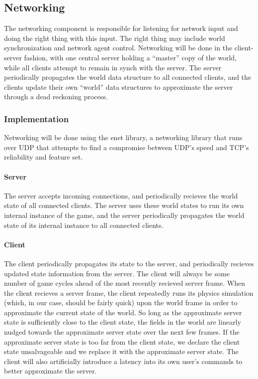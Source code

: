 \documentclass[12pt]{article}
\begin{document}
\subsection{Networking}
The networking component is responsible for listening for network input and
doing the right thing with this input. The right thing may include world
synchronization and network agent control.  Networking will be done in the client-server fashion, with one central server holding a ``master'' copy of the world, while all clients attempt to remain in synch with the server.  The server periodically propagates the world data structure to all connected clients, and the clients update their own ``world'' data structures to approximate the server through a dead reckoning process.

\subsubsection{Implementation}

Networking will be done using the enet library, a networking library that runs over UDP that attempts to find a compromise between UDP's speed and TCP's reliability and feature set.

\paragraph{Server}
The server accepts incoming connections, and periodically recieves the world state of all connected clients.  The server uses these world states to run its own internal instance of the game, and the server periodically propagates the world state of its internal instance to all connected clients.  


\paragraph{Client} The client periodically propagates its state to the server, and periodically recieves updated state information from the server.  The client will always be some number of game cycles ahead of the most recently recieved server frame.  When the client recieves a server frame, the client repeatedly runs its physics simulation (which, in our case, should be fairly quick) upon the world frame in order to approximate the current state of the world.  So long as the approximate server state is sufficiently close to the client state, the fields in the world are linearly nudged towards the approximate server state over the next few frames.  If the approximate server state is too far from the client state, we declare the client state unsalvageable and we replace it with the approximate server state.  The client will also artificially introduce a latency into its own user's commands to better approximate the server.
 
\end{document}
